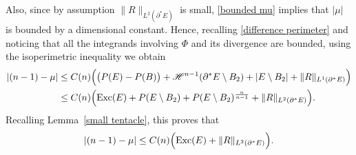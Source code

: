 \documentclass[reqno,11pt]{amsart}
\numberwithin{equation}{section}
\theoremstyle{remark}
\begin{document}
Also, since by assumption $\|R\|_{L^2(\partial^*E)}$ is small, \eqref{bounded mu} implies that $|\mu|$ is bounded by a dimensional constant. Hence, recalling \eqref{difference perimeter} and noticing that all the integrands involving $\Phi$ and its divergence are bounded, using the isoperimetric inequality we obtain
\begin{align*}
|(n-1) - \mu|&\leq C(n)\Big(\big(P(E)-P(B)\big)+\mathscr H^{n-1}(\partial^*E \setminus B_2)+|E\setminus B_2|+\|R\|_{L^1(\partial^*E)}\Big) \\
&\leq C(n)\Big({\rm Exc }(E)+P(E\setminus B_2)+P(E\setminus B_2)^{\frac{n}{n-1}}+\|R\|_{L^2(\partial^*E)}\Big).
\end{align*}
Recalling Lemma~\ref{small tentacle}, this proves that
 \begin{equation} \label{general mu}
|(n-1) - \mu|\leq C(n)\Big({\rm Exc }(E)+\|R\|_{L^2(\partial^*E)}\Big).
\end{equation}


 
\end{document}
